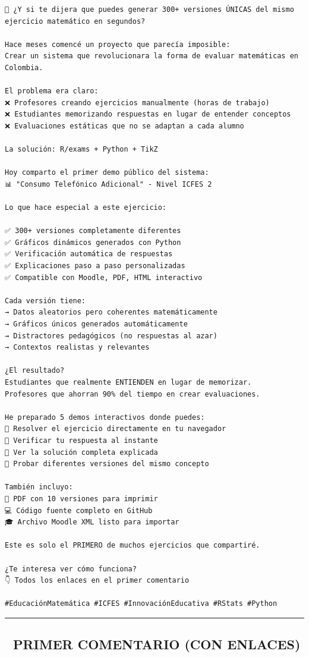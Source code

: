 \documentclass[
]{article}
\begin{document}
\begin{verbatim}
🎯 ¿Y si te dijera que puedes generar 300+ versiones ÚNICAS del mismo ejercicio matemático en segundos?

Hace meses comencé un proyecto que parecía imposible:
Crear un sistema que revolucionara la forma de evaluar matemáticas en Colombia.

El problema era claro:
❌ Profesores creando ejercicios manualmente (horas de trabajo)
❌ Estudiantes memorizando respuestas en lugar de entender conceptos
❌ Evaluaciones estáticas que no se adaptan a cada alumno

La solución: R/exams + Python + TikZ

Hoy comparto el primer demo público del sistema:
📊 "Consumo Telefónico Adicional" - Nivel ICFES 2

Lo que hace especial a este ejercicio:

✅ 300+ versiones completamente diferentes
✅ Gráficos dinámicos generados con Python
✅ Verificación automática de respuestas
✅ Explicaciones paso a paso personalizadas
✅ Compatible con Moodle, PDF, HTML interactivo

Cada versión tiene:
→ Datos aleatorios pero coherentes matemáticamente
→ Gráficos únicos generados automáticamente
→ Distractores pedagógicos (no respuestas al azar)
→ Contextos realistas y relevantes

¿El resultado?
Estudiantes que realmente ENTIENDEN en lugar de memorizar.
Profesores que ahorran 90% del tiempo en crear evaluaciones.

He preparado 5 demos interactivos donde puedes:
🔹 Resolver el ejercicio directamente en tu navegador
🔹 Verificar tu respuesta al instante
🔹 Ver la solución completa explicada
🔹 Probar diferentes versiones del mismo concepto

También incluyo:
📄 PDF con 10 versiones para imprimir
💻 Código fuente completo en GitHub
🎓 Archivo Moodle XML listo para importar

Este es solo el PRIMERO de muchos ejercicios que compartiré.

¿Te interesa ver cómo funciona?
👇 Todos los enlaces en el primer comentario

#EducaciónMatemática #ICFES #InnovaciónEducativa #RStats #Python
\end{verbatim}

\begin{center}\rule{0.5\linewidth}{0.5pt}\end{center}

\subsection{💬 PRIMER COMENTARIO (CON
ENLACES)}\label{primer-comentario-con-enlaces}
\end{document}
